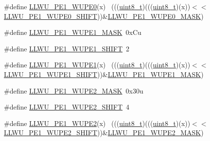 \begin{DoxyCompactItemize}
\#define \hyperlink{group___l_l_w_u___register___masks_gad0111a325ce3f549a1726373cde88f96}{L\+L\+W\+U\+\_\+\+P\+E1\+\_\+\+W\+U\+P\+E0}(x)                                            ~(((\hyperlink{_p_e___types_8h_aba7bc1797add20fe3efdf37ced1182c5}{uint8\+\_\+t})(((\hyperlink{_p_e___types_8h_aba7bc1797add20fe3efdf37ced1182c5}{uint8\+\_\+t})(x))$<$$<$\hyperlink{group___l_l_w_u___register___masks_ga234c02ee9c2b3e3e248c90473e922336}{L\+L\+W\+U\+\_\+\+P\+E1\+\_\+\+W\+U\+P\+E0\+\_\+\+S\+H\+I\+FT}))\&\hyperlink{group___l_l_w_u___register___masks_ga6ed6c56a8797caa64d27eb915c164dad}{L\+L\+W\+U\+\_\+\+P\+E1\+\_\+\+W\+U\+P\+E0\+\_\+\+M\+A\+SK})
\item 
\#define \hyperlink{group___l_l_w_u___register___masks_gac0c417f78992f2ebaca7267ef06d888a}{L\+L\+W\+U\+\_\+\+P\+E1\+\_\+\+W\+U\+P\+E1\+\_\+\+M\+A\+SK}~0x\+Cu
\item 
\#define \hyperlink{group___l_l_w_u___register___masks_gaa9b8224f389f9c3d4f13772d8e5fbeee}{L\+L\+W\+U\+\_\+\+P\+E1\+\_\+\+W\+U\+P\+E1\+\_\+\+S\+H\+I\+FT}~2
\item 
\#define \hyperlink{group___l_l_w_u___register___masks_ga51ac5ef18e9ddf78bd29e79575408a00}{L\+L\+W\+U\+\_\+\+P\+E1\+\_\+\+W\+U\+P\+E1}(x)                                            ~(((\hyperlink{_p_e___types_8h_aba7bc1797add20fe3efdf37ced1182c5}{uint8\+\_\+t})(((\hyperlink{_p_e___types_8h_aba7bc1797add20fe3efdf37ced1182c5}{uint8\+\_\+t})(x))$<$$<$\hyperlink{group___l_l_w_u___register___masks_gaa9b8224f389f9c3d4f13772d8e5fbeee}{L\+L\+W\+U\+\_\+\+P\+E1\+\_\+\+W\+U\+P\+E1\+\_\+\+S\+H\+I\+FT}))\&\hyperlink{group___l_l_w_u___register___masks_gac0c417f78992f2ebaca7267ef06d888a}{L\+L\+W\+U\+\_\+\+P\+E1\+\_\+\+W\+U\+P\+E1\+\_\+\+M\+A\+SK})
\item 
\#define \hyperlink{group___l_l_w_u___register___masks_ga97e8e2fc8ce673f6b4625d307bc94b4a}{L\+L\+W\+U\+\_\+\+P\+E1\+\_\+\+W\+U\+P\+E2\+\_\+\+M\+A\+SK}~0x30u
\item 
\#define \hyperlink{group___l_l_w_u___register___masks_ga0b1bb86eb31a82a18ad1491b0305000b}{L\+L\+W\+U\+\_\+\+P\+E1\+\_\+\+W\+U\+P\+E2\+\_\+\+S\+H\+I\+FT}~4
\item 
\#define \hyperlink{group___l_l_w_u___register___masks_gaf0bb98cad9b61c52ec222ab4443f6999}{L\+L\+W\+U\+\_\+\+P\+E1\+\_\+\+W\+U\+P\+E2}(x)                                            ~(((\hyperlink{_p_e___types_8h_aba7bc1797add20fe3efdf37ced1182c5}{uint8\+\_\+t})(((\hyperlink{_p_e___types_8h_aba7bc1797add20fe3efdf37ced1182c5}{uint8\+\_\+t})(x))$<$$<$\hyperlink{group___l_l_w_u___register___masks_ga0b1bb86eb31a82a18ad1491b0305000b}{L\+L\+W\+U\+\_\+\+P\+E1\+\_\+\+W\+U\+P\+E2\+\_\+\+S\+H\+I\+FT}))\&\hyperlink{group___l_l_w_u___register___masks_ga97e8e2fc8ce673f6b4625d307bc94b4a}{L\+L\+W\+U\+\_\+\+P\+E1\+\_\+\+W\+U\+P\+E2\+\_\+\+M\+A\+SK})
$$
\end{DoxyCompactItemize}
